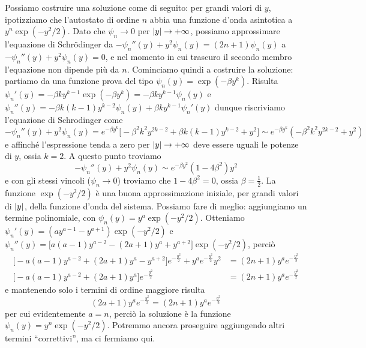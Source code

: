 Possiamo costruire una soluzione come di seguito: per grandi valori di $y$, ipotizziamo che l'autostato di ordine $n$ abbia una funzione d'onda asintotica a $y^n\exp(-y^2/2)$.
Dato che $\psi_n\to 0$ per $\left|{y}\right|\to+\infty$, possiamo approssimare l'equazione di Schr\"odinger da $-\psi_n''(y)+y^2\psi_n(y)=(2n+1)\psi_n(y)$ a $-\psi_n''(y)+y^2\psi_n(y)=0$, e nel momento in cui trascuro il secondo membro l'equazione non dipende più da $n$.
Cominciamo quindi a costruire la soluzione: partiamo da una funzione prova del tipo $\psi_n(y)=\exp(-\beta y^k)$.
Risulta $\psi_n'(y)=-\beta ky^{k-1}\exp(-\beta y^k)=-\beta ky^{k-1}\psi_n(y)$ e $\psi_n''(y)=-\beta k(k-1)y^{k-2}\psi_n(y)+\beta ky^{k-1}\psi_n'(y)$ dunque riscriviamo l'equazione di Schrodinger come
\begin{equation}
	-\psi_n''(y)+y^2\psi_n(y)=e^{-\beta y^k}\big[-\beta^2k^2y^{2k-2}+\beta k(k-1)y^{k-2}+y^2\big]\sim e^{-\beta y^k}(-\beta^2k^2y^{2k-2}+y^2)
\end{equation}
e affinch\'e l'espressione tenda a zero per $\left|{y}\right|\to+\infty$ deve essere uguali le potenze di $y$, ossia $k=2$.
A questo punto troviamo
\begin{equation}
	-\psi_n''(y)+y^2\psi_n(y)\sim e^{-\beta y^2}(1-4\beta^2)y^2
\end{equation}
e con gli stessi vincoli ($\psi_n\to 0$) troviamo che $1-4\beta^2=0$, ossia $\beta=\frac12$.
La funzione $\exp(-y^2/2)$ è una buona approssimazione iniziale, per grandi valori di $\left|{y}\right|$, della funzione d'onda del sistema.
Possiamo fare di meglio: aggiungiamo un termine polinomiale, con $\psi_n(y)=y^a\exp(-y^2/2)$.
Otteniamo $\psi_n'(y)=(ay^{a-1}-y^{a+1})\exp(-y^2/2)$ e $\psi_n''(y)=\big[a(a-1)y^{a-2}-(2a+1)y^a+y^{a+2}\big]\exp(-y^2/2)$, perciò
\begin{equation}
	\begin{aligned}
		\big[-a(a-1)y^{a-2}+(2a+1)y^a-y^{a+2}\big]e^{-\frac{y^2}2}+y^ae^{-\frac{y^2}2}y^2&=(2n+1)y^ae^{-\frac{y^2}2}\\
		\big[-a(a-1)y^{a-2}+(2a+1)y^a\big]e^{-\frac{y^2}2}&=(2n+1)y^ae^{-\frac{y^2}2}
	\end{aligned}
\end{equation}
e mantenendo solo i termini di ordine maggiore risulta
\begin{equation}
	(2a+1)y^ae^{-\frac{y^2}2}=(2n+1)y^ae^{-\frac{y^2}2}
\end{equation}
per cui evidentemente $a=n$, perciò la soluzione è la funzione $\psi_n(y)=y^n\exp(-y^2/2)$.
Potremmo ancora proseguire aggiungendo altri termini ``correttivi'', ma ci fermiamo qui.

